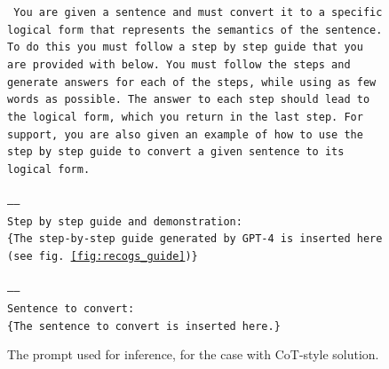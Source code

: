 \documentclass[11pt]{article}
\begin{document}
    \begin{figure}
        \small
        \texttt{
            You are given a sentence and must convert it to a specific logical form that
            represents the semantics of the sentence. To do this you must follow a step
            by step guide that you are provided with below. You must follow the steps and
            generate answers for each of the steps, while using as few words as possible.
            The answer to each step should lead to the logical form, which you return in
            the last step. For support, you are also given an example of how to use the
            step by step guide to convert a given sentence to its logical form.\\
            \\
            -----\\
            Step by step guide and demonstration:\\
            {\color{red}\{The step-by-step guide generated by GPT-4 is inserted here (see fig. \ref{fig:recogs_guide})\}}\\
            \\
            -----\\
            Sentence to convert:\\
            {\color{red}\{The sentence to convert is inserted here.\}}
        }
        \caption{The prompt used for inference, for the case with CoT-style solution.}
        \label{fig:prompt_using_guide}
    \end{figure}
\end{document}
